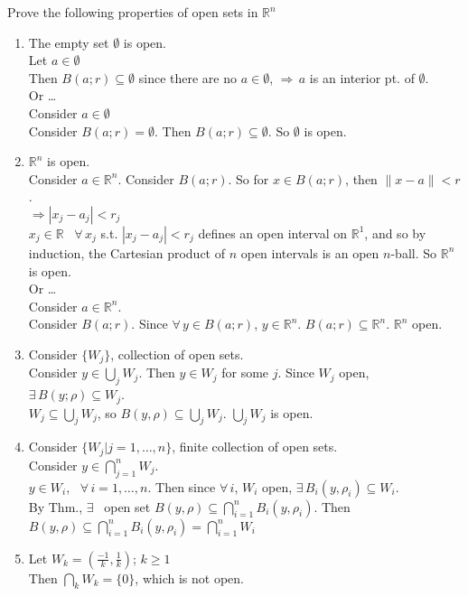 \documentclass[twoside]{amsart}
\theoremstyle{plain}
\theoremstyle{definition}
\newcommand{\exercisehead}[1]
  {
   \noindent{\small\bf Exercise #1.}
   \smallskip}
\begin{document}
\exercisehead{5} Prove the following properties of open sets in $\mathbb{R}^n$
\begin{enumerate}
\item The empty set $\emptyset$ is open.  \medskip \\
Let $a \in \emptyset$ \\
\phantom{ Let } Then $B(a;r) \subseteq \emptyset$ since there are no $a \in \emptyset$,  $\Longrightarrow \, a$ is an interior pt. of $\emptyset$.  \\

Or \dots \\

Consider $a \in \emptyset$ \\
Consider $B(a;r) = \emptyset$.  Then $B(a;r) \subseteq \emptyset$.  So $\emptyset$ is open.
\item $\mathbb{R}^n$ is open.  \bigskip \\
  Consider $a \in \mathbb{R}^n$.  Consider $B(a;r)$.  So for $x \in B(a;r)$, then $\| x-a \| < r$.  \\
  $\Longrightarrow |x_j - a_j| < r_j$ \\
  $x_j \in \mathbb{R}$ \quad \, $\forall \, x_j $ s.t. $|x_j - a_j| < r_j$ defines an open interval on $\mathbb{R}^1$, and so by induction, the Cartesian product of $n$ open intervals is an open $n$-ball.  So $\mathbb{R}^n$ is open.  \\

Or \dots \\

Consider $a \in \mathbb{R}^n$.  \\
Consider $B(a;r)$.  Since $\forall \, y \in B(a;r)$, $y\in \mathbb{R}^n$.  $B(a;r) \subseteq \mathbb{R}^n$.  $\mathbb{R}^n$ open.  
\item Consider $\{ W_j \}$, collection of open sets.  \\
Consider $y\in \bigcup_j W_j$.  Then $y \in W_j$ for some $j$.  Since $W_j$ open, $\exists \, B(y;\rho) \subseteq W_j$.  \\
$W_j \subseteq \bigcup_j W_j$, so $B(y,\rho) \subseteq \bigcup_j W_j$.  $\bigcup_j W_j$ is open.  
\item Consider $\{ W_j | j =1, \dots, n\}$, finite collection of open sets.    \\
  Consider $ y \in \bigcap_{j=1}^n W_j$.  \\
$y \in W_i$, \, $\forall \, i =1, \dots, n$.  Then since $\forall \, i$, $W_i$ open, $\exists \, B_i(y,\rho_i) \subseteq W_i$.  \\
  By Thm., $\exists$ \, open set $B(y,\rho) \subseteq \bigcap_{i=1}^n B_i(y, \rho_i)$.  Then $B(y,\rho) \subseteq \bigcap_{i=1}^n B_i(y,\rho_i) = \bigcap_{i=1}^n W_i $
\item Let $W_k = \left( \frac{-1}{k}, \frac{1}{k} \right)$; $k \geq 1$ \\
Then $\bigcap_k W_k = \{ 0 \}$, which is not open.  
\end{enumerate}
\end{document}
